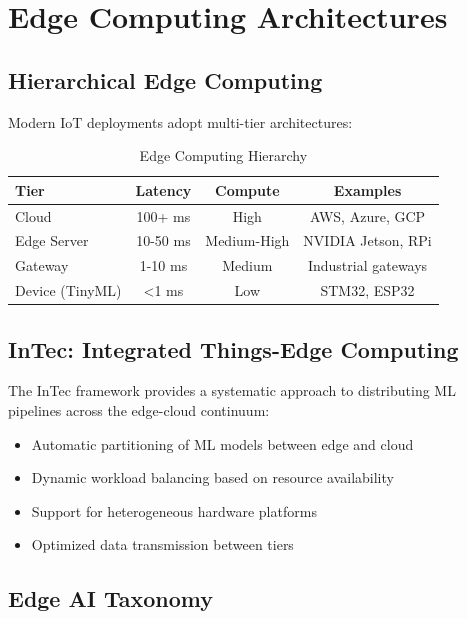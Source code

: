 \documentclass[12pt,a4paper]{article}
\begin{document}
\section{Edge Computing Architectures}

\subsection{Hierarchical Edge Computing}

Modern IoT deployments adopt multi-tier architectures:

\begin{table}[H]
\centering
\caption{Edge Computing Hierarchy}
\begin{tabular}{lccc}
\toprule
\textbf{Tier} & \textbf{Latency} & \textbf{Compute} & \textbf{Examples} \\
\midrule
Cloud & 100+ ms & High & AWS, Azure, GCP \\
Edge Server & 10-50 ms & Medium-High & NVIDIA Jetson, RPi \\
Gateway & 1-10 ms & Medium & Industrial gateways \\
Device (TinyML) & <1 ms & Low & STM32, ESP32 \\
\bottomrule
\end{tabular}
\end{table}

\subsection{InTec: Integrated Things-Edge Computing}

The InTec framework provides a systematic approach to distributing ML pipelines across the edge-cloud continuum:
\begin{itemize}
    \item Automatic partitioning of ML models between edge and cloud
    \item Dynamic workload balancing based on resource availability
    \item Support for heterogeneous hardware platforms
    \item Optimized data transmission between tiers
\end{itemize}

\subsection{Edge AI Taxonomy}
\end{document}
